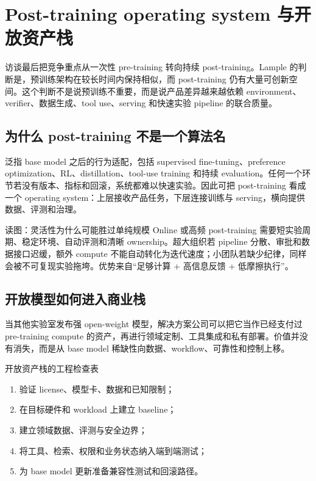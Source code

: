 \section{Post-training operating system 与开放资产栈}

访谈最后把竞争重点从一次性 pre-training 转向持续 post-training。Lample 的判断是，预训练架构在较长时间内保持相似，而 post-training 仍有大量可创新空间。这个判断不是说预训练不重要，而是说产品差异越来越依赖 environment、verifier、数据生成、tool use、serving 和快速实验 pipeline 的联合质量。

\subsection{为什么 post-training 不是一个算法名}

 泛指 base model 之后的行为适配，包括 supervised fine-tuning、preference optimization、RL、distillation、tool-use training 和持续 evaluation。任何一个环节若没有版本、指标和回滚，系统都难以快速实验。因此可把 post-training 看成一个 operating system：上层接收产品任务，下层连接训练与 serving，横向提供数据、评测和治理。


\begin{knowledgebox}{读图：灵活性为什么可能胜过单纯规模}
Online 或高频 post-training 需要短实验周期、稳定环境、自动评测和清晰 ownership。超大组织若 pipeline 分散、审批和数据接口迟缓，额外 compute 不能自动转化为迭代速度；小团队若缺少纪律，同样会被不可复现实验拖垮。优势来自“足够计算 + 高信息反馈 + 低摩擦执行”。
\end{knowledgebox}

\subsection{开放模型如何进入商业栈}

当其他实验室发布强 open-weight 模型，解决方案公司可以把它当作已经支付过 pre-training compute 的资产，再进行领域定制、工具集成和私有部署。价值并没有消失，而是从 base model 稀缺性向数据、workflow、可靠性和控制上移。


\begin{importantbox}{开放资产栈的工程检查表}
\begin{enumerate}
  \item 验证 license、模型卡、数据和已知限制；
  \item 在目标硬件和 workload 上建立 baseline；
  \item 建立领域数据、评测与安全边界；
  \item 将工具、检索、权限和业务状态纳入端到端测试；
  \item 为 base model 更新准备兼容性测试和回滚路径。
\end{enumerate}
\end{importantbox}

